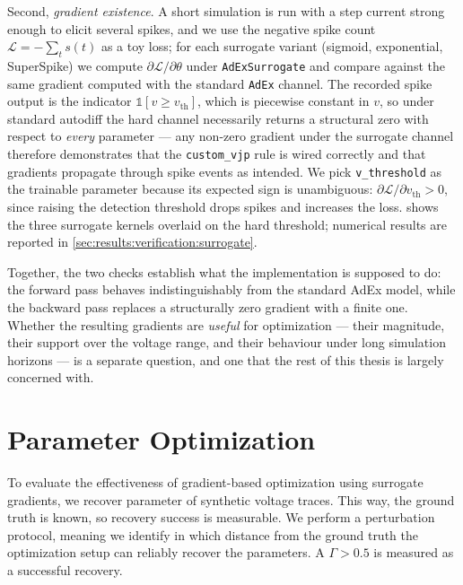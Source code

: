 Second, \emph{gradient existence}.
A short simulation is run with a step current strong enough to elicit several spikes, and we use the negative spike count $\mathcal{L} = -\sum_t s(t)$ as a toy loss; for each surrogate variant (sigmoid, exponential, SuperSpike) we compute $\partial \mathcal{L} / \partial \theta$ under \texttt{AdExSurrogate} and compare against the same gradient computed with the standard \texttt{AdEx} channel.
The recorded spike output is the indicator $\mathds{1}[v \geq v_{\text{th}}]$, which is piecewise constant in $v$, so under standard autodiff the hard channel necessarily returns a structural zero with respect to \emph{every} parameter --- any non-zero gradient under the surrogate channel therefore demonstrates that the \texttt{custom\_vjp} rule is wired correctly and that gradients propagate through spike events as intended.
We pick \texttt{v\_threshold} as the trainable parameter because its expected sign is unambiguous: $\partial \mathcal{L} / \partial v_{\text{th}} > 0$, since raising the detection threshold drops spikes and increases the loss.
 shows the three surrogate kernels overlaid on the hard threshold; numerical results are reported in \cref{sec:results:verification:surrogate}.

Together, the two checks establish what the implementation is supposed to do:
the forward pass behaves indistinguishably from the standard \gls{AdEx} model, while the backward pass replaces a structurally zero gradient with a finite one.
Whether the resulting gradients are \emph{useful} for optimization --- their magnitude, their support over the voltage range, and their behaviour under long simulation horizons --- is a separate question, and one that the rest of this thesis is largely concerned with.


\section{Parameter Optimization}\label{sec:method:param_opt}
To evaluate the effectiveness of gradient-based optimization using surrogate gradients, we recover parameter of synthetic voltage traces.
This way, the ground truth is known, so recovery success is measurable.
We perform a perturbation protocol, meaning we identify in which distance from the ground truth the optimization setup can reliably recover the parameters.
A $\Gamma > 0.5$ is measured as a successful recovery.

